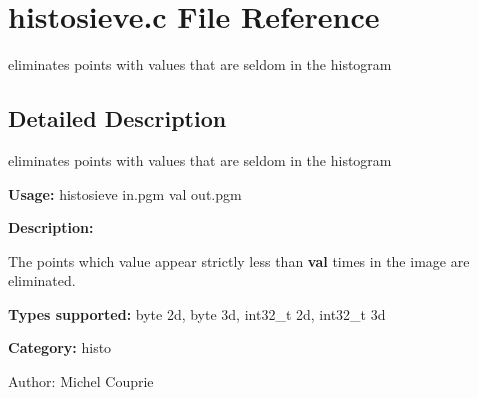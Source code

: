 \section{histosieve.c File Reference}
\label{histosieve_8c}
eliminates points with values that are seldom in the histogram  




\label{_details}
\subsection{Detailed Description}
eliminates points with values that are seldom in the histogram 

{\bf Usage:} histosieve in.pgm val out.pgm

{\bf Description:}

The points which value appear strictly less than {\bf val} times in the image are eliminated.

{\bf Types supported:} byte 2d, byte 3d, int32\_\-t 2d, int32\_\-t 3d

{\bf Category:} histo

\begin{Desc}
\item[Author:]Michel Couprie \end{Desc}
